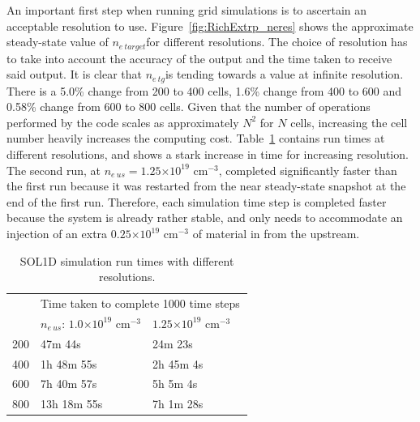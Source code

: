 \documentclass[11pt, twocolumn]{article}  %
\providecommand{\e}[1]{\ensuremath{\times 10^{#1}}} %
\providecommand{\neus}{$n_{e~us}$} %
\providecommand{\netarget}{$n_{e~target}$} %
\providecommand{\netg}{$n_{e~tg}$} %
\begin{document}
An important first step when running grid simulations is to ascertain an acceptable resolution to use. Figure~\ref{fig:RichExtrp_neres} shows the approximate steady-state value of \netarget for different resolutions. The choice of resolution has to take into account the accuracy of the output and the time taken to receive said output. It is clear that \netg is tending towards a value at infinite resolution. There is a 5.0\% change from 200 to 400 cells, 1.6\% change from 400 to 600 and 0.58\% change from 600 to 800 cells. Given that the number of operations performed by the code scales as approximately $N^2$ for $N$ cells, increasing the cell number heavily increases the computing cost. Table~\ref{tab:sol1dres} contains run times at different resolutions, and shows a stark increase in time for increasing resolution. The second run, at \neus $= 1.25\e{19}$ cm$^{-3}$, completed significantly faster than the first run because it was restarted from the near steady-state snapshot at the end of the first run. Therefore, each simulation time step is completed faster because the system is already rather stable, and only needs to accommodate an injection of an extra $0.25\e{19}$ cm$^{-3}$ of material in from the upstream.

\begin{table}[]
\caption{SOL1D simulation run times with different resolutions.}
\label{tab:sol1dres}
\begin{tabular}{l|l|l|l}
\multicolumn{1}{l|}{\multirow{2}{*}{}} & \multicolumn{3}{l}{Time taken to complete 1000 time steps}    \\ \cline{2-4} 
 \multicolumn{1}{l|}{Resolution}        & \multicolumn{1}{l|}{\neus: $1.0\e{19}$ cm$^{-3}$} & \multicolumn{1}{l|}{$1.25\e{19}$ cm$^{-3}$}  &  \\ \hline
                   200                 &      47m 44s          &    24m 23s         &  \\
                   400                 &      1h 48m 55s       &    2h 45m 4s       &  \\
                   600                 &      7h 40m 57s       &    5h 5m 4s        &  \\
                   800                 &      13h 18m 55s      &    7h 1m 28s       &  
\end{tabular}
\end{table}
\end{document}
